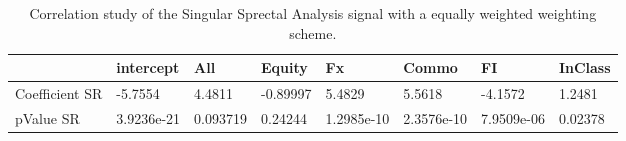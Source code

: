 \begin{table}[H]
\centering
\begin{tabular}{llllllll}
& intercept & All & Equity & Fx & Commo & FI & InClass \\ 
\hline 
Coefficient SR & -5.7554 & 4.4811 & -0.89997 & 5.4829 & 5.5618 & -4.1572 & 1.2481 \\ 
pValue SR & 3.9236e-21 & 0.093719 & 0.24244 & 1.2985e-10 & 2.3576e-10 & 7.9509e-06 & 0.02378 \\ 
\hline
\end{tabular}
\caption{Correlation study of the Singular Sprectal Analysis signal with a equally weighted weighting scheme.}
\label{SSA_EW_CORR}
\end{table}